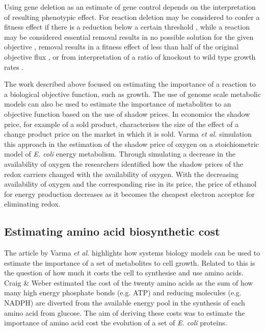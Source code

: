 Using gene deletion as an estimate of gene control depends on the interpretation of resulting phenotypic effect. For reaction deletion may be considered to confer a fitness effect if there is a reduction below a certain threshold \cite{pal2006}, while a reaction may be considered essential removal results in no possible solution for the given objective \cite{becker2008}, removal results in a fitness effect of less than half of the original objective flux \cite{papp2004}, or from interpretation of a ratio of knockout to wild type growth rates \cite{wang2009}.

The work described above focused on estimating the importance of a reaction to a biological objective function, such as growth. The use of genome scale metabolic models can also be used to estimate the importance of metabolites to an objective function based on the use of shadow prices. In economics the shadow price, for example of a sold product, characterises the size of the effect of a change product price on the market in which it is sold. Varma \emph{et al.} \cite{varma1993} simulation this approach in the estimation of the shadow price of oxygen on a stoichiometric model of \emph{E. coli} energy metabolism. Through simulating a decrease in the availability of oxygen the researchers identified how the shadow prices of the redox carriers changed with the availability of oxygen. With the decreasing availability of oxygen and the corresponding rise in its price, the price of ethanol for energy production decreases as it becomes the cheapest electron acceptor for eliminating redox.

\subsection{Estimating amino acid biosynthetic cost}

The article by Varma \emph{et al.} highlights how systems biology models can be used to estimate the importance of a set of metabolites to cell growth. Related to this is the question of how much it costs the cell to synthesise and use amino acids. Craig \& Weber \cite{craig1998} estimated the cost of the twenty amino acids as the sum of how many high energy phosphate bonds (e.g. ATP) and reducing molecules (e.g. NADPH) are diverted from the available energy pool in the synthesis of each amino acid from glucose. The aim of deriving these costs was to estimate the importance of amino acid cost the evolution of a set of \emph{E. coli} proteins.


